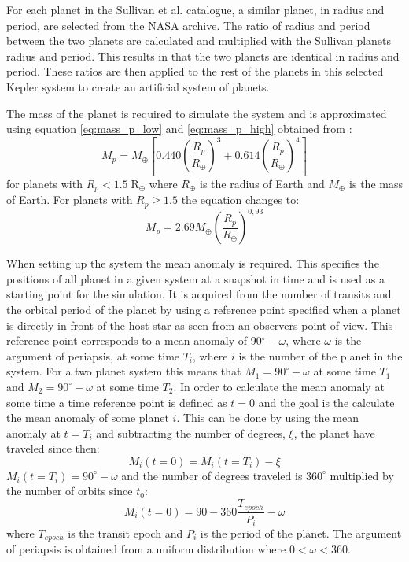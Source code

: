 \documentclass[12pt]{report}
\begin{document}
	For each planet in the Sullivan et al. catalogue, a similar planet, in radius and period, are selected from the NASA archive. The ratio of radius and period between the two planets are calculated and multiplied with the Sullivan planets radius and period. This results in that the two planets are identical in radius and period. These ratios are then applied to the rest of the planets in this selected Kepler system to create an artificial system of planets.  
	
	The mass of the planet is required to simulate the system and is approximated using equation \ref{eq:mass_p_low} and \ref{eq:mass_p_high} obtained from \cite{2015ApJ...809...77S}:
	\begin{equation}
	\label{eq:mass_p_low}
	M_p = M_{\oplus} \left[0.440 \left(\frac{R_p}{R_{\oplus}}\right)^3 + 0.614\left(\frac{R_p}{R_{\oplus}}\right)^4\right]
	\end{equation}
	for planets with $R_p < 1.5 \; \mathrm{R_{\oplus}}$ where $R_{\oplus}$ is the radius of Earth and $M_{\oplus}$ is the mass of Earth. For planets with $R_p \geq 1.5$ the equation changes to:
	\begin{equation}
	\label{eq:mass_p_high}
	M_p = 2.69 M_{\oplus}\left(\frac{R_p}{R_{\oplus}}\right)^{0,93}
	\end{equation}
	
	When setting up the system the mean anomaly is required. This specifies the positions of all planet in a given system at a snapshot in time and is used as a starting point for the simulation. It is acquired from the number of transits and the orbital period of the planet by using a reference point specified when a planet is directly in front of the host star as seen from an observers point of view. This reference point corresponds to a mean anomaly of 90$^{\circ} - \omega$, where $\omega$ is the argument of periapsis, at some time $T_i$, where $i$ is the number of the planet in the system. For a two planet system this means that $M_1=90^{\circ} - \omega$ at some time $T_1$ and $M_2=90^{\circ} - \omega$ at some time $T_2$. In order to calculate the mean anomaly at some time a time reference point is defined as $t=0$ and the goal is the calculate the mean anomaly of some planet $i$. This can be done by using the mean anomaly at $t = T_i$ and subtracting the number of degrees, $\xi$, the planet have traveled since then:
\begin{equation}
	M_i(t=0) = M_i(t=T_i) - \xi
\end{equation}
	$M_i(t=T_i) = 90^{\circ} - \omega$ and the number of degrees traveled is $360^{\circ}$ multiplied by the number of orbits since $t_0$:
\begin{equation}
	M_i(t=0) = 90 - 360 \frac{T_{epoch}}{P_i} - \omega
\end{equation}
	where $T_{epoch}$ is the transit epoch and $P_i$ is the period of the planet. The argument of periapsis is obtained from a uniform distribution where $0 < \omega < 360$. 
	
\end{document}

